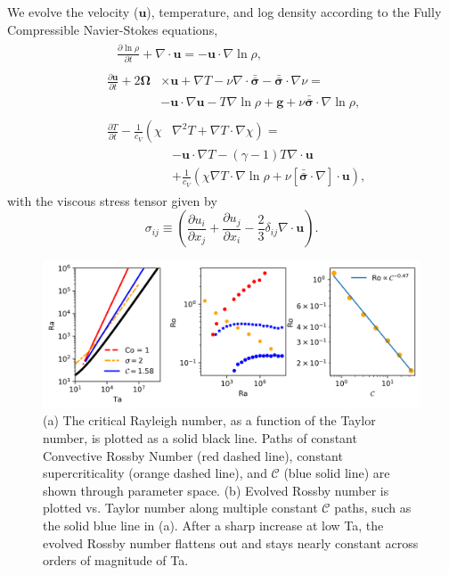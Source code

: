 \documentclass[twocolumn, amsmath, amsfonts, amssymb]{aastex62}
\newcommand{\grad}{\ensuremath{\nabla}}
\newcommand{\lilstressT}{\ensuremath{\bm{\bar{\bar{\sigma}}}}}
\begin{document}
We evolve the velocity ($\bm{u}$), temperature, and log density according to the
Fully Compressible Navier-Stokes equations,
\begin{align}
&\begin{aligned}
&\frac{\partial \ln\rho}{\partial t} + \grad\cdot\bm{u} 
    = -\bm{u}\cdot\grad\ln\rho,
	\label{eqn:continuity_eqn}
\end{aligned}\\
&\begin{aligned}
\frac{\partial\bm{u}}{\partial t} + 2\bm{\Omega}&\times\bm{u} + \grad T - 
\nu\grad\cdot\lilstressT - \lilstressT\cdot\grad\nu = \\
&-\bm{u}\cdot\grad\bm{u} - T\grad\ln\rho + \bm{g} + 
\nu\lilstressT\cdot\grad\ln\rho,
\label{eqn:momentum_eqn}
\end{aligned}\\
&\begin{aligned}
\frac{\partial T}{\partial t} -\frac{1}{c_V}\left(\right.\chi&\left.
    \grad^2 T + \grad T\cdot\grad\chi\right) = \\
	&-\bm{u}\cdot\grad T - (\gamma-1)T\grad\cdot{\bm{u}} \\
	&+ \frac{1}{c_V}\left(\chi\grad T \cdot\grad\ln\rho +
	\nu\left[\lilstressT\cdot\nabla\right]\cdot\bm{u}\right), 
	\label{eqn:energy_eqn}
\end{aligned}
\end{align}
with the viscous stress tensor given by
\begin{equation}
\sigma_{ij} \equiv \left(\frac{\partial u_i}{\partial x_j} + 
\frac{\partial u_j}{\partial x_i} - \frac{2}{3}\delta_{ij}\grad\cdot\bm{u}\right).
	\label{eqn:stress_tensor}
\end{equation}


\begin{figure}[t!]
\includegraphics[width=\textwidth]{./figs/parameter_space.png}
\caption{(a) The critical Rayleigh number, as a function of the Taylor number, 
is plotted as a solid black line. Paths of constant Convective Rossby Number
(red dashed line), constant supercriticality (orange dashed line), and 
$\mathcal{C}$ (blue solid line) are shown through parameter space. (b) Evolved
Rossby number is plotted vs. Taylor number along multiple constant $\mathcal{C}$
paths, such as the solid blue line in (a). 
After a sharp increase at low Ta, the evolved Rossby number flattens
out and stays nearly constant across orders of magnitude of Ta.
\label{fig:parameter_space} }
\end{figure}
\end{document}
